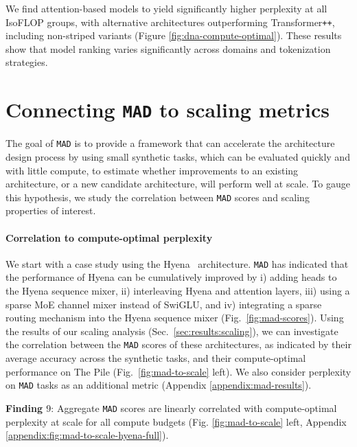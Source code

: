 We find attention-based models to yield significantly higher perplexity at all IsoFLOP groups, with alternative architectures outperforming Transformer{\tt ++}, including non-striped variants (Figure \ref{fig:dna-compute-optimal}). These results show that model ranking varies significantly across domains and tokenization strategies.

\section{Connecting {\tt MAD} to scaling metrics}

The goal of {\tt MAD} is to provide a framework that can accelerate the architecture design process by using small synthetic tasks, which can be evaluated quickly and with little compute, to estimate whether improvements to an existing architecture, or a new candidate architecture, will perform well at scale. To gauge this hypothesis, we study the correlation between {\tt MAD} scores and scaling properties of interest.

\paragraph{Correlation to compute-optimal perplexity}

We start with a case study using the Hyena~\cite{poli2023hyena} architecture.
{\tt MAD} has indicated that the performance of Hyena can be cumulatively improved by i) adding heads to the Hyena sequence mixer, ii) interleaving Hyena and attention layers, iii) using a sparse MoE channel mixer instead of SwiGLU, and iv) integrating a sparse routing mechanism into the Hyena sequence mixer (Fig.~\ref{fig:mad-scores}).
Using the results of our scaling analysis (Sec.~\ref{sec:results:scaling}), we can investigate the correlation between the {\tt MAD} scores of these architectures, as indicated by their average accuracy across the synthetic tasks, and their compute-optimal performance on The Pile (Fig.~\ref{fig:mad-to-scale} left). We also consider perplexity on {\tt MAD} tasks as an additional metric (Appendix \ref{appendix:mad-results}).

\begin{tcolorbox}[enhanced, frame hidden, sharp corners, colback=blue!5, boxsep=2pt, before skip=1pt, after skip=1pt]
   \textbf{Finding $9$}: Aggregate {\tt MAD} scores are linearly correlated with compute-optimal perplexity at scale for all compute budgets (Fig. \ref{fig:mad-to-scale} left, Appendix \ref{appendix:fig:mad-to-scale-hyena-full}).
\end{tcolorbox}

